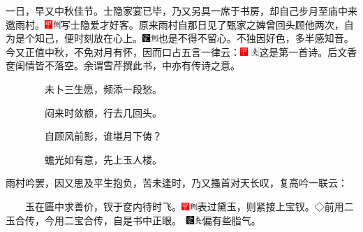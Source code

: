 一日，早又中秋佳节。士隐家宴已毕，乃又另具一席于书房，却自己步月至庙中来邀雨村。{\includegraphics[width=3mm]{../Images/00002}\includegraphics[width=3mm]{../Images/00011}\footnotesize 写士隐爱才好客。}原来雨村自那日见了甄家之婢曾回头顾他两次，自为是个知己，便时刻放在心上。{\includegraphics[width=3mm]{../Images/00006}\includegraphics[width=3mm]{../Images/00011}\footnotesize 也是不得不留心。不独因好色，多半感知音。}今又正值中秋，不免对月有怀，因而口占五言一律云：{\includegraphics[width=3mm]{../Images/00002} \includegraphics[width=3mm]{../Images/00012}\footnotesize   这是第一首诗。后文香奁闺情皆不落空。余谓雪芹撰此书，中亦有传诗之意。}

　　　　未卜三生愿，频添一段愁。

　　　　闷来时敛额，行去几回头。

　　　　自顾风前影，谁堪月下俦？

　　　　蟾光如有意，先上玉人楼。

雨村吟罢，因又思及平生抱负，苦未逢时，乃又搔首对天长叹，复高吟一联云：

　　玉在匮中求善价，钗于奁内待时飞。{{\includegraphics[width=3mm]{../Images/00002}\includegraphics[width=3mm]{../Images/00011}\footnotesize 表过黛玉，则紧接上宝钗。◇前用二玉合传，今用二宝合传，自是书中正眼。　}\includegraphics[width=3mm]{../Images/00006}\includegraphics[width=3mm]{../Images/00012}\footnotesize   偏有些脂气。}

